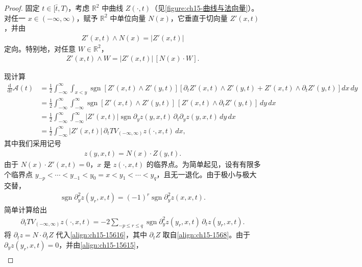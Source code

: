 \documentclass[../../main.tex]{subfiles}
\begin{document}
\begin{proof}
固定 $t\in[\bar t,T)$，考虑 $\mathbb{R}^2$ 中曲线 $Z(\cdot,t)$（见\cref{figure:ch15-曲线与法向量}）。对任一 $x\in(-\infty,\infty)$，赋予 $\mathbb{R}^2$ 中单位向量 $N(x)$，它垂直于切向量 $Z'(x,t)$，并由
\begin{align}
Z'(x,t)\wedge N(x)=|Z'(x,t)|
\label{align:ch15-15611}
\end{align}
定向。特别地，对任意 $W\in\mathbb{R}^2$，
\begin{align}
Z'(x,t)\wedge W=|Z'(x,t)|\,[N(x)\cdot W].
\label{align:ch15-15612}
\end{align}

现计算
\begin{align}
\frac{\mathrm{d}}{\mathrm{d}t}\mathscr{A}(t)&=\frac12\int_{-\infty}^{\infty}\int_{x<y}\operatorname{sgn}[Z'(x,t)\wedge Z'(y,t)]\left[\partial_tZ'(x,t)\wedge Z'(y,t)+Z'(x,t)\wedge\partial_tZ'(y,t)\right]dx\,dy\nonumber\\
&=\frac12\int_{-\infty}^{\infty}\int_{-\infty}^{\infty}\operatorname{sgn}[Z'(x,t)\wedge Z'(y,t)]\,[Z'(x,t)\wedge\partial_tZ'(y,t)]\,dy\,dx\nonumber\\
&=\frac12\int_{-\infty}^{\infty}\int_{-\infty}^{\infty}|Z'(x,t)|\operatorname{sgn}\partial_yz(y,x,t)\,\partial_t\partial_yz(y,x,t)\,dy\,dx\nonumber\\
&=\frac12\int_{-\infty}^{\infty}|Z'(x,t)|\,\partial_tTV_{(-\infty,\infty)}z(\cdot,x,t)\,dx,
\label{align:ch15-15613}
\end{align}
其中我们采用记号
\begin{align}
z(y,x,t)=N(x)\cdot Z(y,t).
\label{align:ch15-15614}
\end{align}
由于 $N(x)\cdot Z'(x,t)=0$，$x$ 是 $z(\cdot,x,t)$ 的临界点。为简单起见，设有有限多个临界点 $y_{-p}<\cdots<y_{-1}<y_0=x<y_1<\cdots<y_q$，且无一退化。由于极小与极大交替，
\begin{align}
\operatorname{sgn}\partial_y^2z(y_r,x,t)=(-1)^r\operatorname{sgn}\partial_y^2z(x,x,t).
\label{align:ch15-15615}
\end{align}
简单计算给出
\begin{align}
\partial_tTV_{(-\infty,\infty)}z(\cdot,x,t)=-2\sum_{-p\leqslant r\leqslant q}\operatorname{sgn}\partial_y^2z(y_r,x,t)\,\partial_tz(y_r,x,t).
\label{align:ch15-15616}
\end{align}
将 $\partial_tz=N\cdot\partial_tZ$ 代入\eqref{align:ch15-15616}，其中 $\partial_tZ$ 取自\eqref{align:ch15-1568}。由于 $\partial_yz(y_r,x,t)=0$，并由\eqref{align:ch15-15615}，
\begin{align}

\end{align}
\end{proof}
\end{document}
